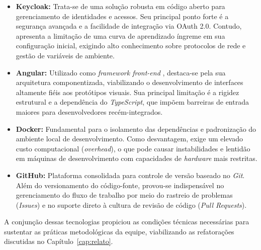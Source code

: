 \begin{itemize}
    \item \textbf{Keycloak:} Trata-se de uma solução robusta em código aberto \cite{keycloak_docs} para gerenciamento de identidades e acessos. Seu principal ponto forte é a segurança avançada e a facilidade de integração via OAuth 2.0. Contudo, apresenta a limitação de uma curva de aprendizado íngreme em sua configuração inicial, exigindo alto conhecimento sobre protocolos de rede e gestão de variáveis de ambiente.
    
    \item \textbf{Angular:} Utilizado como \textit{framework front-end} \cite{angular_docs}, destaca-se pela sua arquitetura componentizada, viabilizando o desenvolvimento de interfaces altamente fiéis aos protótipos visuais. Sua principal limitação é a rigidez estrutural e a dependência do \textit{TypeScript}, que impõem barreiras de entrada maiores para desenvolvedores recém-integrados.
    
    \item \textbf{Docker:} Fundamental para o isolamento das dependências e padronização do ambiente local de desenvolvimento. Como desvantagem, exige um elevado custo computacional (\textit{overhead}), o que pode causar instabilidades e lentidão em máquinas de desenvolvimento com capacidades de \textit{hardware} mais restritas.
    
    \item \textbf{GitHub:} Plataforma consolidada para controle de versão baseado no \textit{Git}. Além do versionamento do código-fonte, provou-se indispensável no gerenciamento do fluxo de trabalho por meio do rastreio de problemas (\textit{Issues}) e no suporte direto à cultura de revisão de código (\textit{Pull Requests}).
\end{itemize}

A conjunção dessas tecnologias propiciou as condições técnicas necessárias para sustentar as práticas metodológicas da equipe, viabilizando as refatorações discutidas no Capítulo~\ref{cap:relato}.
